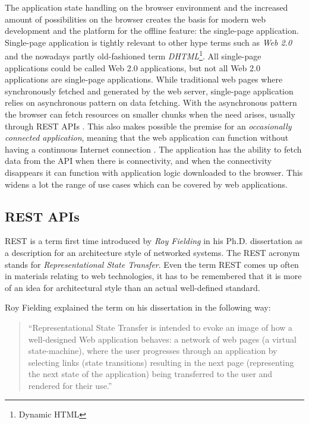 The application state handling on the browser environment and the increased amount of possibilities on the browser creates the basis for modern web development and the platform for the offline feature: the single-page application. Single-page application is tightly relevant to other hype terms such as \textit{Web 2.0} and the nowadays partly old-fashioned term \textit{DHTML}\footnote{Dynamic HTML}. All single-page applications could be called Web 2.0 applications, but not all Web 2.0 applications are single-page applications. While traditional web pages where synchronously fetched and generated by the web server, single-page application relies on asynchronous pattern on data fetching. \cite{garrett_ajax:_2005} With the asynchronous pattern the browser can fetch resources on smaller chunks when the need arises, usually through REST APIs \cite{masse_rest_2011}. This also makes possible the premise for an \textit{occasionally connected application}, meaning that the web application can function without having a continuous Internet connection \cite{casario_html5_2011}. The application has the ability to fetch data from the API when there is connectivity, and when the connectivity disappears it can function with application logic downloaded to the browser. This widens a lot the range of use cases which can be covered by web applications.



\subsection{REST APIs}

REST is a term first time introduced by \textit{Roy Fielding} in his Ph.D. dissertation \cite{fielding_architectural_2000} as a description for an architecture style of networked systems. The REST acronym stands for \textit{Representational State Transfer}. Even the term REST comes up often in materials relating to web technologies, it has to be remembered that it is more of an idea for architectural style than an actual well-defined standard. 

Roy Fielding explained the term on his dissertation in the following way:
\begin{quote}
	``Representational State Transfer is intended to evoke an image of how a well-designed Web application behaves: a network of web pages (a virtual state-machine), where the user progresses through an application by selecting links (state transitions) resulting in the next page (representing the next state of the application) being transferred to the user and rendered for their use.''
\end{quote}

